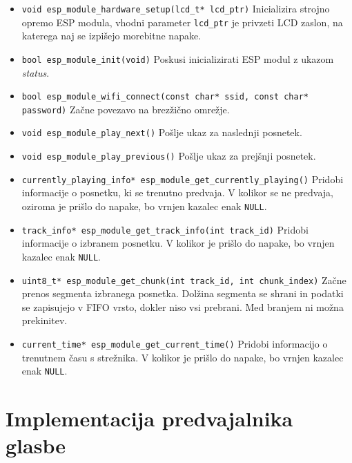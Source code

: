 \documentclass[12pt,a4paper,twoside,openright,slovene]{book}
\begin{document}
\begin{itemize}
	\item[] \lstinline{void esp_module_hardware_setup(lcd_t* lcd_ptr)}\newline
	Inicializira strojno opremo ESP modula, vhodni parameter \lstinline{lcd_ptr} je privzeti LCD zaslon, na katerega naj se izpišejo morebitne napake.
	\item[] \lstinline{bool esp_module_init(void)}\newline
	Poskusi inicializirati ESP modul z ukazom \textit{status}.
	\item[] \lstinline{bool esp_module_wifi_connect(const char* ssid, const char* password)}\newline
	Začne povezavo na brezžično omrežje.
	\item[] \lstinline{void esp_module_play_next()}\newline
	Pošlje ukaz za naslednji posnetek.
	\item[] \lstinline{void esp_module_play_previous()}\newline
	Pošlje ukaz za prejšnji posnetek.
	\item[] \lstinline{currently_playing_info* esp_module_get_currently_playing()}\newline
	Pridobi informacije o posnetku, ki se trenutno predvaja. V kolikor se ne predvaja, oziroma je prišlo do napake, bo vrnjen kazalec enak \lstinline{NULL}.
	\item[] \lstinline{track_info* esp_module_get_track_info(int track_id)}\newline
	Pridobi informacije o izbranem posnetku. V kolikor je prišlo do napake, bo vrnjen kazalec enak \lstinline{NULL}.
	\item[] \lstinline{uint8_t* esp_module_get_chunk(int track_id, int chunk_index)}\newline
	Začne prenos segmenta izbranega posnetka. Dolžina segmenta se shrani in podatki se zapisujejo v FIFO vrsto, dokler niso vsi prebrani. Med branjem ni možna prekinitev.
	\item[] \lstinline{current_time* esp_module_get_current_time()}\newline
	Pridobi informacijo o trenutnem času s strežnika. V kolikor je prišlo do napake, bo vrnjen kazalec enak \lstinline{NULL}.
\end{itemize}



\section{Implementacija predvajalnika glasbe}
\end{document}
